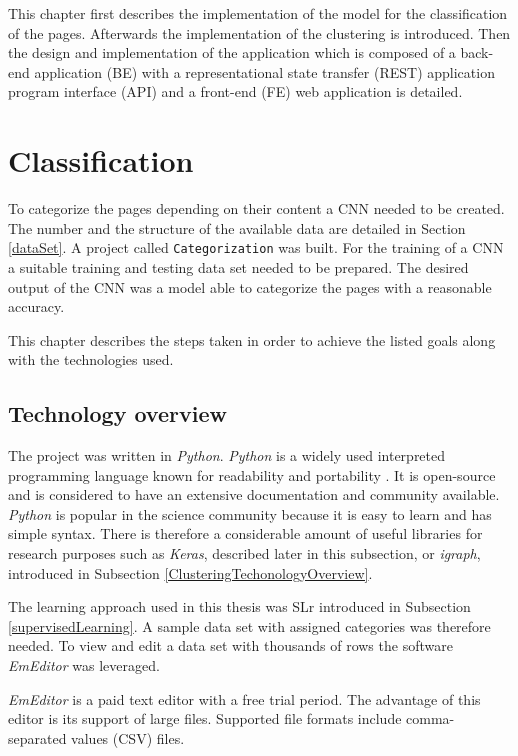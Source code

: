 This chapter first describes the implementation of the model for the classification of the pages. Afterwards the implementation of the clustering is introduced. Then the design and implementation of the application which is composed of a back-end application (BE) with a representational state transfer (REST) application program interface (API) and a front-end (FE) web application is detailed. 

\section{Classification} \label{ClassificationDevelopment}
To categorize the pages depending on their content a CNN needed to be created. The number and the structure of the available data are detailed in Section \ref{dataSet}. A project called \texttt{Categorization} was built. For the training of a CNN a suitable training and testing data set needed to be prepared. The desired output of the CNN was a model able to categorize the pages with a reasonable accuracy. 

This chapter describes the steps taken in order to achieve the listed goals along with the technologies used.

\subsection{Technology overview} \label{ClassificationTechonologyOverview}
The project was written in \textit{Python}. \textit{Python} is a widely used interpreted programming language known for readability and portability \cite{aboutPython}. It is open-source and is considered to have an extensive documentation and community available. \textit{Python} is popular in the science community because it is easy to learn and has simple syntax. There is therefore a considerable amount of useful libraries for research purposes such as \textit{Keras}, described later in this subsection, or \textit{igraph}, introduced in Subsection \ref{ClusteringTechonologyOverview}.  

The learning approach used in this thesis was SLr introduced in Subsection \ref{supervisedLearning}. A sample data set with assigned categories was therefore needed. To view and edit a data set with thousands of rows the software \textit{EmEditor} \cite{emeditor} was leveraged. 

\textit{EmEditor} is a paid text editor with a free trial period. The advantage of this editor is its support of large files. Supported file formats include comma-separated values (CSV) files. 

